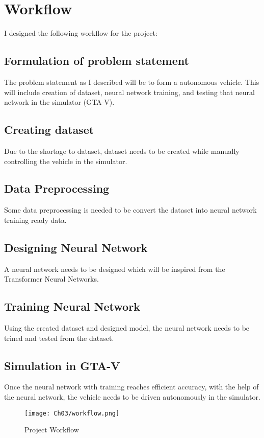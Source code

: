 \section{Workflow}
I designed the following workflow for the project:

\subsection{Formulation of problem statement}
The problem statement as I described will be to form a autonomous vehicle. This will include creation of dataset, neural network training, and testing that neural network in the simulator (GTA-V).

\subsection{Creating dataset}
Due to the shortage to dataset, dataset needs to be created while manually controlling the vehicle in the simulator.

\subsection{Data Preprocessing}
Some data preprocessing is needed to be convert the dataset into neural network training ready data.

\subsection{Designing Neural Network}
A neural network needs to be designed which will be inspired from the Transformer Neural Networks.

\subsection{Training Neural Network}
Using the created dataset and designed model, the neural network needs to be trined and tested from the dataset.

\subsection{Simulation in GTA-V}
Once the neural network with training reaches efficient accuracy, with the help of the neural network, the vehicle needs to be driven autonomously in the simulator.

\begin{figure}[h]
    \centering
    \texttt{[image: Ch03/workflow.png]}
    \caption{Project Workflow}
    \label{figure:1}
\end{figure}
\FloatBarrier

